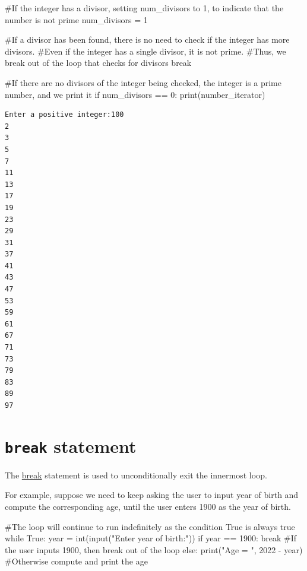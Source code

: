 \documentclass[
  letterpaper,
  DIV=11,
  numbers=noendperiod]{scrreprt}
\newenvironment{Shaded}{\begin{snugshade}}{\end{snugshade}}
\newcommand{\BuiltInTok}[1]{\textcolor[rgb]{0.00,0.23,0.31}{#1}}
\newcommand{\CommentTok}[1]{\textcolor[rgb]{0.37,0.37,0.37}{#1}}
\newcommand{\ControlFlowTok}[1]{\textcolor[rgb]{0.00,0.23,0.31}{#1}}
\newcommand{\DecValTok}[1]{\textcolor[rgb]{0.68,0.00,0.00}{#1}}
\newcommand{\NormalTok}[1]{\textcolor[rgb]{0.00,0.23,0.31}{#1}}
\newcommand{\OperatorTok}[1]{\textcolor[rgb]{0.37,0.37,0.37}{#1}}
\newcommand{\StringTok}[1]{\textcolor[rgb]{0.13,0.47,0.30}{#1}}
\newcommand{\VariableTok}[1]{\textcolor[rgb]{0.07,0.07,0.07}{#1}}
\begin{document}
\begin{Shaded}
\begin{Highlighting}[]
            \CommentTok{\#If the integer has a divisor, setting num\_divisors to 1, to indicate that the number is not prime}
\NormalTok{            num\_divisors }\OperatorTok{=} \DecValTok{1}
            
            \CommentTok{\#If a divisor has been found, there is no need to check if the integer has more divisors.}
            \CommentTok{\#Even if the integer has a single divisor, it is not prime. }
            \CommentTok{\#Thus, we \textquotesingle{}break\textquotesingle{} out of the loop that checks for divisors}
            \ControlFlowTok{break}
            
    \CommentTok{\#If there are no divisors of the integer being checked, the integer is a prime number, and we print it}
    \ControlFlowTok{if}\NormalTok{ num\_divisors }\OperatorTok{==} \DecValTok{0}\NormalTok{:}
        \BuiltInTok{print}\NormalTok{(number\_iterator)   }
\end{Highlighting}
\end{Shaded}

\begin{verbatim}
Enter a positive integer:100
2
3
5
7
11
13
17
19
23
29
31
37
41
43
47
53
59
61
67
71
73
79
83
89
97
\end{verbatim}

\hypertarget{break-statement}{%
\section{\texorpdfstring{\texttt{break}
statement}{break statement}}\label{break-statement}}

The
\href{https://docs.python.org/3/reference/simple_stmts.html\#break}{break}
statement is used to unconditionally exit the innermost loop.

For example, suppose we need to keep asking the user to input year of
birth and compute the corresponding age, until the user enters 1900 as
the year of birth.

\begin{Shaded}
\begin{Highlighting}[]
\CommentTok{\#The loop will continue to run indefinitely as the condition \textquotesingle{}True\textquotesingle{} is always true}
\ControlFlowTok{while} \VariableTok{True}\NormalTok{:}
\NormalTok{    year }\OperatorTok{=} \BuiltInTok{int}\NormalTok{(}\BuiltInTok{input}\NormalTok{(}\StringTok{"Enter year of birth:"}\NormalTok{))}
    \ControlFlowTok{if}\NormalTok{ year }\OperatorTok{==} \DecValTok{1900}\NormalTok{:}
        \ControlFlowTok{break}        \CommentTok{\#If the user inputs 1900, then break out of the loop}
    \ControlFlowTok{else}\NormalTok{:}
        \BuiltInTok{print}\NormalTok{(}\StringTok{"Age = "}\NormalTok{, }\DecValTok{2022} \OperatorTok{{-}}\NormalTok{ year)    }\CommentTok{\#Otherwise compute and print the age}
\end{Highlighting}
\end{Shaded}
\end{document}
